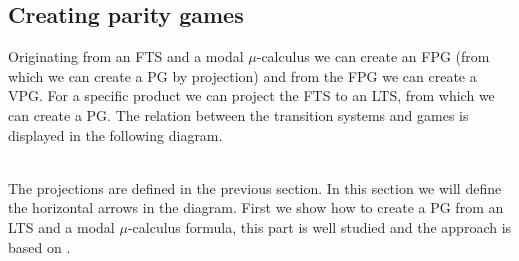 \documentclass[]{article}
\begin{document}
\subsection{Creating parity games}
Originating from an FTS and a modal $\mu$-calculus we can create an FPG (from which we can create a PG by projection) and from the FPG we can create a VPG. For a specific product we can project the FTS to an LTS, from which we can create a PG. The relation between the transition systems and games is displayed in the following diagram.
\\\\
The projections are defined in the previous section. In this section we will define the horizontal arrows in the diagram. First we show how to create a PG from an LTS and a  modal $\mu$-calculus formula, this part is well studied and the approach is based on \cite{Bradfield2018}.
\end{document}
